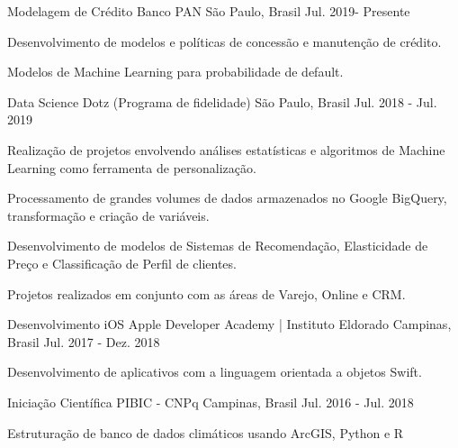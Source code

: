 \begin{cventries}
    \cventry
    {Modelagem de Crédito}
    {Banco PAN}
    {São Paulo, Brasil}
    {Jul. 2019- Presente}
    {
      \begin{cvitems}
        \item {Desenvolvimento de modelos e políticas de concessão e manutenção de crédito. }
        \item {Modelos de Machine Learning para probabilidade de default. }
      \end{cvitems}
    }

    \cventry
    {Data Science}
    {Dotz (Programa de fidelidade)}
    {São Paulo, Brasil}
    {Jul. 2018 - Jul. 2019}
    {
      \begin{cvitems}
        \item {Realização de projetos envolvendo análises estatísticas e algoritmos de Machine Learning como ferramenta de \newline personalização. }
        \item {Processamento de grandes volumes de dados armazenados no Google BigQuery, transformação e criação de variáveis.}
        \item {Desenvolvimento de modelos de Sistemas de Recomendação, Elasticidade de Preço e Classificação de Perfil de clientes. }
        \item {Projetos realizados em conjunto com as áreas de Varejo, Online e CRM. }
      \end{cvitems}
    }

    \cventry
    {Desenvolvimento iOS}
    {Apple Developer Academy | Instituto Eldorado}
    {Campinas, Brasil}
    {Jul. 2017 - Dez. 2018}
    {
      \begin{cvitems}
        \item {Desenvolvimento de aplicativos com a linguagem orientada a objetos Swift.}
      \end{cvitems}
    }

    \cventry
      {Iniciação Científica}
      {PIBIC - CNPq}
      {Campinas, Brasil}
      {Jul. 2016 - Jul. 2018}
      {
        \begin{cvitems}
          \item {Estruturação de banco de dados climáticos usando ArcGIS, Python e R}
        \end{cvitems}
      }
\end{cventries}
